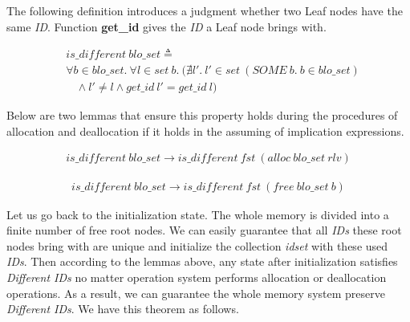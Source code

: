 The following definition introduces a judgment whether two Leaf nodes have the same \emph{ID}. Function \textbf{get\_id} gives the \emph{ID} a Leaf node brings with.

\begin{definition} 
\vspace{-7pt}
\end{definition}
{\footnotesize
\begin{align*}
&is\_different\ blo\_set \triangleq \\
&\forall b \in blo\_set.\ \forall l \in set\ b.\ (\nexists l'.\ l' \in set\ (SOME\ b.\ b \in blo\_set) \\
&\ \ \ \ \wedge l' \ne l \wedge get\_id\ l' = get\_id\ l)
\end{align*}
}
\vspace{-12pt}

Below are two lemmas that ensure this property holds during the procedures of allocation and deallocation if it holds in the assuming of implication expressions.

\begin{lemma} 
\vspace{-7pt}
\end{lemma}
{\footnotesize
\begin{align*}
is\_different\ blo\_set \longrightarrow is\_different\ fst\ (alloc\ blo\_set\ rlv)
\end{align*}
}
\vspace{-12pt}

\begin{lemma} 
\vspace{-7pt}
\end{lemma}
{\footnotesize
\begin{align*}
is\_different\ blo\_set \longrightarrow is\_different\ fst\ (free\ blo\_set\ b)
\end{align*}
}
\vspace{-12pt}

Let us go back to the initialization state. The whole memory is divided into a finite number of free root nodes. We can easily guarantee that all \emph{IDs} these root nodes bring with are unique and initialize the collection \emph{idset} with these used \emph{IDs}. Then according to the lemmas above, any state after initialization satisfies \emph{Different IDs} no matter operation system performs allocation or deallocation operations. As a result, we can guarantee the whole memory system preserve \emph{Different IDs}. We have this theorem as follows.

